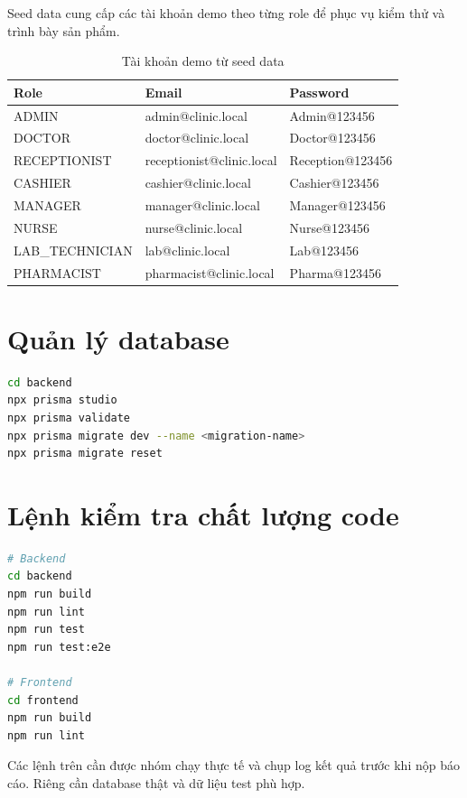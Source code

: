 Seed data cung cấp các tài khoản demo theo từng role để phục vụ kiểm thử và trình bày sản phẩm.

\begin{longtable}{|p{3.2cm}|p{5.5cm}|p{4cm}|}
\caption{Tài khoản demo từ seed data}\\
\hline
\textbf{Role} & \textbf{Email} & \textbf{Password} \\
\hline
ADMIN & admin@clinic.local & Admin@123456 \\
\hline
DOCTOR & doctor@clinic.local & Doctor@123456 \\
\hline
RECEPTIONIST & receptionist@clinic.local & Reception@123456 \\
\hline
CASHIER & cashier@clinic.local & Cashier@123456 \\
\hline
MANAGER & manager@clinic.local & Manager@123456 \\
\hline
NURSE & nurse@clinic.local & Nurse@123456 \\
\hline
LAB\_TECHNICIAN & lab@clinic.local & Lab@123456 \\
\hline
PHARMACIST & pharmacist@clinic.local & Pharma@123456 \\
\hline
\end{longtable}

\section{Quản lý database}

\begin{lstlisting}[language=bash,caption={Các lệnh quản lý database}]
cd backend
npx prisma studio
npx prisma validate
npx prisma migrate dev --name <migration-name>
npx prisma migrate reset
\end{lstlisting}

\section{Lệnh kiểm tra chất lượng code}

\begin{lstlisting}[language=bash,caption={Các lệnh kiểm tra build, lint và test}]
# Backend
cd backend
npm run build
npm run lint
npm run test
npm run test:e2e

# Frontend
cd frontend
npm run build
npm run lint
\end{lstlisting}

Các lệnh trên cần được nhóm chạy thực tế và chụp log kết quả trước khi nộp báo cáo. Riêng  cần database thật và dữ liệu test phù hợp.

